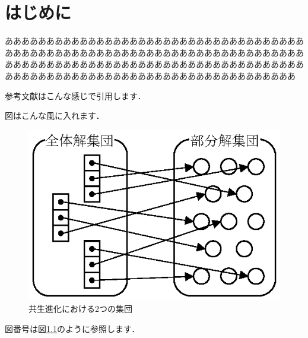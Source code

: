 \chapter{はじめに}
あああああああああああああああああああああああああああああああああああああああああああああああああああああああああああああああああああああああああああああああああああああああああああああああああああああああああああああああああああああああああああああああああああああああああああああああ

参考文献はこんな感じで引用します．
\cite{Quinlan96}
\cite{Quinlan89}
\cite{Quinlan93}
\cite{Iba94}
\cite{C50}
\cite{Nakayama00}
\cite{Otani06}
\cite{Otani04}
\cite{Saino88}
\cite{Ishibashi11}
\cite{Ushijima11}


図はこんな風に入れます．

\begin{figure}[tbhp]
\begin{center}
\includegraphics[scale=0.95]{image/se.eps}
\caption{共生進化における2つの集団}
\label{fig:02se}
\end{center}
\end{figure}

図番号は図\ref{fig:02se}のように参照します．
